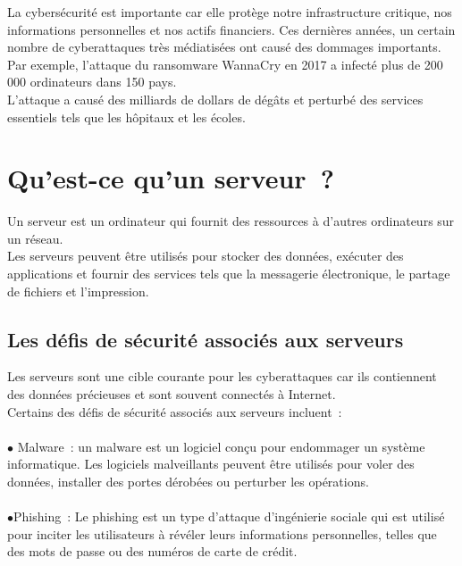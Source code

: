 La cybersécurité est importante car elle protège notre infrastructure critique, nos informations personnelles et nos actifs financiers. Ces dernières années, un certain nombre de cyberattaques très médiatisées ont causé des dommages importants.\\
 Par exemple, l'attaque du ransomware WannaCry en 2017 a infecté plus de 200 000 ordinateurs dans 150 pays.\\ L'attaque a causé des milliards de dollars de dégâts et perturbé des services essentiels tels que les hôpitaux et les écoles.\\

  \paragraph{ }
 \section{ Qu'est-ce qu'un serveur ? }

Un serveur est un ordinateur qui fournit des ressources à d'autres ordinateurs sur un réseau. \\Les serveurs peuvent être utilisés pour stocker des données, exécuter des applications et fournir des services tels que la messagerie électronique, le partage de fichiers et l'impression.\\

\subsection{ Les défis de sécurité associés aux serveurs}

Les serveurs sont une cible courante pour les cyberattaques car ils contiennent des données précieuses et sont souvent connectés à Internet.\\ Certains des défis de sécurité associés aux serveurs incluent :

 \paragraph{ } $\bullet$ Malware : un malware est un logiciel conçu pour endommager un système informatique. Les logiciels malveillants peuvent être utilisés pour voler des données, installer des portes dérobées ou perturber les opérations.
  \paragraph{ } $\bullet$Phishing :  Le phishing est un type d'attaque d'ingénierie sociale qui est utilisé pour inciter les utilisateurs à révéler leurs informations personnelles, telles que des mots de passe ou des numéros de carte de crédit.
  
